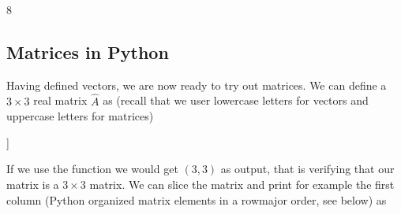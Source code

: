 \documentclass[letterpaper,10pt,english]{sphinxmanual}
\begin{document}
\begin{sphinxVerbatim}[commandchars=\\\{\}]
   
  \PYG{p}{[}  \PYG{p}{]}
\end{sphinxVerbatim}

\begin{sphinxVerbatim}[commandchars=\\\{\}]
8
\end{sphinxVerbatim}


\subsection{Matrices in Python}
\label{\detokenize{chapter2:matrices-in-python}}
Having defined vectors, we are now ready to try out matrices. We can
define a \(3 \times 3 \) real matrix \(\hat{A}\) as (recall that we user
lowercase letters for vectors and uppercase letters for matrices)

\begin{sphinxVerbatim}[commandchars=\\\{\}]
   
  \PYG{p}{[} \PYG{p}{[}  \PYG{p}{]} \PYG{p}{[}  \PYG{p}{]} \PYG{p}{[}  \PYG{p}{]} \PYG{p}{]}
\end{sphinxVerbatim}

\begin{sphinxVerbatim}[commandchars=\\\{\}]
[[1.38629436 1.94591015 2.07944154]
 [1.09861229 2.30258509 2.39789527]
 [1.38629436 1.60943791 1.94591015]]
\end{sphinxVerbatim}

If we use the  function we would get \((3, 3)\) as output, that is verifying that our matrix is a \(3\times 3\) matrix. We can slice the matrix and print for example the first column (Python organized matrix elements in a row\sphinxhyphen{}major order, see below) as
\end{document}

